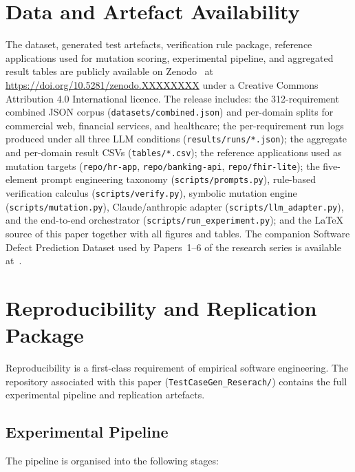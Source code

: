 \documentclass[11pt,letterpaper]{article}
\begin{document}
\section{Data and Artefact Availability}
\label{sec:availability}

The dataset, generated test artefacts, verification rule package, reference applications used for mutation scoring, experimental pipeline, and aggregated result tables are publicly available on Zenodo~\cite{javvadi2026raitg_dataset} at \url{https://doi.org/10.5281/zenodo.XXXXXXXX} under a Creative Commons Attribution 4.0 International licence. The release includes: the 312-requirement combined JSON corpus (\texttt{datasets/combined.json}) and per-domain splits for commercial web, financial services, and healthcare; the per-requirement run logs produced under all three LLM conditions (\texttt{results/runs/*.json}); the aggregate and per-domain result CSVs (\texttt{tables/*.csv}); the reference applications used as mutation targets (\texttt{repo/hr-app}, \texttt{repo/banking-api}, \texttt{repo/fhir-lite}); the five-element prompt engineering taxonomy (\texttt{scripts/prompts.py}), rule-based verification calculus (\texttt{scripts/verify.py}), symbolic mutation engine (\texttt{scripts/mutation.py}), Claude/anthropic adapter (\texttt{scripts/llm\_adapter.py}), and the end-to-end orchestrator (\texttt{scripts/run\_experiment.py}); and the LaTeX source of this paper together with all figures and tables. The companion Software Defect Prediction Dataset used by Papers~1--6 of the research series is available at~\cite{javvadi2025defect_dataset}.

\section{Reproducibility and Replication Package}
\label{sec:reproducibility}

Reproducibility is a first-class requirement of empirical software engineering. The repository associated with this paper (\texttt{TestCaseGen\_Reserach/}) contains the full experimental pipeline and replication artefacts.

\subsection{Experimental Pipeline}

The pipeline is organised into the following stages:
\end{document}

